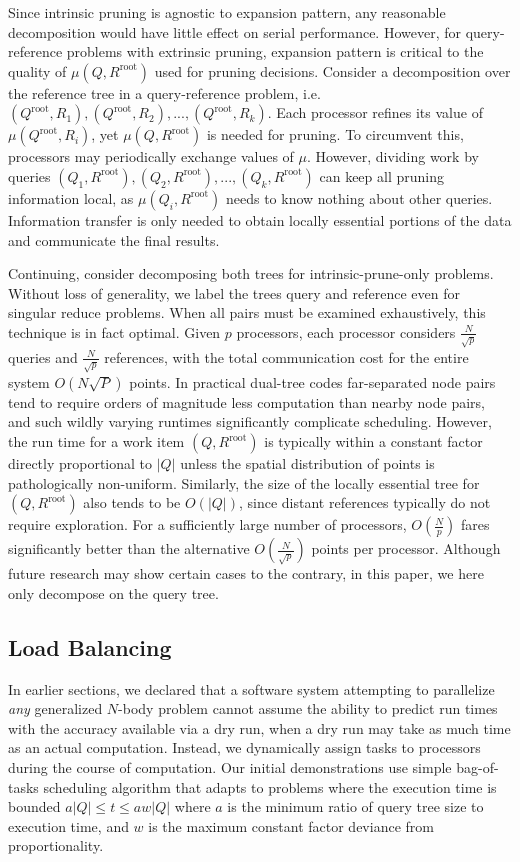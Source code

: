 \documentclass[times, leqno,twocolumn]{article}
\newcommand{\kdroot}[1]{#1^{\text{root}}}
\newcommand{\inmu}{\mu}
\begin{document}
Since intrinsic pruning is agnostic to expansion pattern, any reasonable decomposition would have little effect on serial performance.
However, for query-reference problems with extrinsic pruning, expansion pattern is critical to the quality of $\inmu(Q, \kdroot{R})$ used for pruning decisions.
Consider a decomposition over the reference tree in a query-reference problem, i.e. $(\kdroot{Q}, R_1), (\kdroot{Q}, R_2), ..., (\kdroot{Q}, R_k)$.
Each processor refines its value of $\inmu(\kdroot{Q}, R_i)$, yet $\inmu(Q, \kdroot{R})$ is needed for pruning.
To circumvent this, processors may periodically exchange values of $\mu$.
However, dividing work by queries $(Q_1, \kdroot{R}), (Q_2, \kdroot{R}), ..., (Q_k, \kdroot{R})$ can keep all pruning information local, as $\inmu(Q_i, \kdroot{R})$ needs to know nothing about other queries.
Information transfer is only needed to obtain locally essential portions of the data and communicate the final results.

Continuing, consider decomposing both trees for intrinsic-prune-only problems.
Without loss of generality, we label the trees query and reference even for singular reduce problems.
When all pairs must be examined exhaustively, this technique is in fact optimal.
Given $p$ processors, each processor considers $\frac{N}{\sqrt{p}}$ queries and $\frac{N}{\sqrt{p}}$ references, with the total communication cost for the entire system $O(N\sqrt{P})$ points.
In practical dual-tree codes far-separated node pairs tend to require orders of magnitude less computation than nearby node pairs, and such wildly varying runtimes significantly complicate scheduling.
However, the run time for a work item $(Q, \kdroot{R})$ is typically within a constant factor directly proportional to $|Q|$ unless the spatial distribution of points is pathologically non-uniform.
Similarly, the size of the locally essential tree for $(Q, \kdroot{R})$ also tends to be $O(|Q|)$, since distant references typically do not require exploration.
For a sufficiently large number of processors, $O(\frac{N}{p})$ fares significantly better than the alternative $O(\frac{N}{\sqrt{p}})$ points per processor.
Although future research may show certain cases to the contrary, in this paper, we here only decompose on the query tree.

\subsection{Load Balancing}

In earlier sections, we declared that a software system attempting to parallelize {\it any} generalized $N$-body problem cannot assume the ability to predict run times with the accuracy available via a dry run, when a dry run may take as much time as an actual computation.
Instead, we dynamically assign tasks to processors during the course of computation.
Our initial demonstrations use simple bag-of-tasks scheduling algorithm that adapts to problems where the execution time is bounded $a|Q| \leq t \leq aw|Q|$ where $a$ is the minimum ratio of query tree size to execution time, and $w$ is the maximum constant factor deviance from proportionality.
\end{document}
